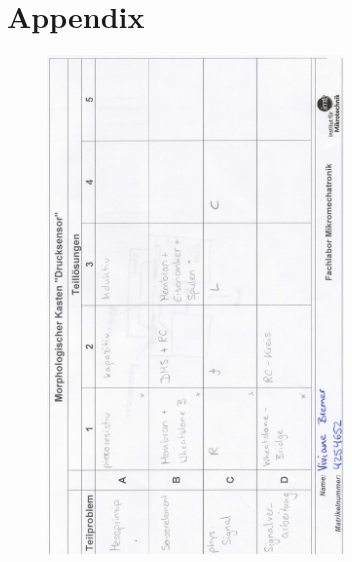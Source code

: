 \chapter{Appendix}


\begin{figure}[H]
\centering

\end{figure}

\newpage
\begin{figure}[H]
	\centering
	
\end{figure}

\newpage

\begin{figure}[H]
	\centering
	\includegraphics[width=0.7\textwidth]{figures/MorphologischerKasten_Bremer.png}
\end{figure}

